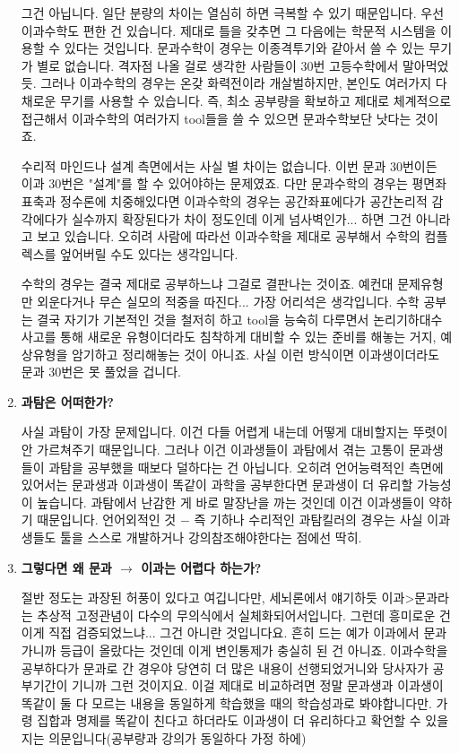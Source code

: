 \begin{enumerate}
그건 아닙니다. 일단 분량의 차이는 열심히 하면 극복할 수 있기 때문입니다.     우선 이과수학도 편한 건 있습니다. 제대로 틀을 갖추면 그 다음에는 학문적 시스템을 이용할 수 있다는 것입니다.   문과수학이 경우는 이종격투기와 같아서 쓸 수 있는 무기가 별로 없습니다. 격자점 나올 걸로 생각한 사람들이 30번 고등수학에서 말아먹었듯.   그러나 이과수학의 경우는 온갖 화력전이라 개살벌하지만, 본인도 여러가지 다채로운 무기를 사용할 수 있습니다.   즉, 최소 공부량을 확보하고 제대로 체계적으로 접근해서 이과수학의 여러가지 tool들을 쓸 수 있으면 문과수학보단 낫다는 것이죠.  
\vspace{5mm}

수리적 마인드나 설계 측면에서는 사실 별 차이는 없습니다. 이번 문과 30번이든 이과 30번은 "설계"를 할  수 있어야하는 문제였죠.   다만 문과수학의 경우는 평면좌표축과 정수론에 치중해있다면      이과수학의 경우는 공간좌표에다가 공간논리적 감각에다가 실수까지 확장된다가 차이 정도인데   이게 넘사벽인가... 하면 그건 아니라고 보고 있습니다.    오히려 사람에 따라선 이과수학을 제대로 공부해서 수학의 컴플렉스를 엎어버릴 수도 있다는 생각입니다.   
\vspace{5mm}

수학의 경우는 결국 제대로 공부하느냐 그걸로 결판나는 것이죠.   예컨대 문제유형만 외운다거나 무슨 실모의 적중을 따진다... 가장 어리석은 생각입니다.   수학 공부는 결국 자기가 기본적인 것을 철저히 하고 tool을 능숙히 다루면서 논리기하대수 사고를 통해   새로운 유형이더라도 침착하게 대비할 수 있는 준비를 해놓는 거지, 예상유형을 암기하고 정리해놓는 것이 아니죠.   사실 이런 방식이면 이과생이더라도 문과 30번은 못 풀었을 겁니다.   


\item \textbf{과탐은 어떠한가?}   

사실 과탐이 가장 문제입니다. 이건 다들 어렵게 내는데 어떻게 대비할지는 뚜렷이 안 가르쳐주기 때문입니다.   그러나 이건 이과생들이 과탐에서 겪는 고통이 문과생들이 과탐을 공부했을 때보다 덜하다는 건 아닙니다.   오히려 언어능력적인 측면에 있어서는 문과생과 이과생이 똑같이 과학을 공부한다면 문과생이 더 유리할 가능성이 높습니다.   과탐에서 난감한 게 바로 말장난을 까는 것인데 이건 이과생들이 약하기 때문입니다.   언어외적인 것 $-$ 즉 기하나 수리적인 과탐킬러의 경우는 사실 이과생들도 툴을 스스로 개발하거나 강의참조해야한다는 점에선 딱히.   


\item \textbf{그렇다면 왜 문과 $\rightarrow$ 이과는 어렵다 하는가?}   

절반 정도는 과장된 허풍이 있다고 여깁니다만, 세뇌론에서 얘기하듯 이과>문과라는 추상적 고정관념이 다수의 무의식에서 실체화되어서입니다.   그런데 흥미로운 건 이게 직접 검증되었느냐... 그건 아니란 것입니다요.   흔히 드는 예가 이과에서 문과 가니까 등급이 올랐다는 것인데 이게 변인통제가 충실히 된 건 아니죠.   이과수학을 공부하다가 문과로 간 경우야 당연히 더 많은 내용이 선행되었거니와 당사자가 공부기간이 기니까 그런 것이지요.   이걸 제대로 비교하려면 정말 문과생과 이과생이 똑같이 둘 다 모르는 내용을 동일하게 학습했을 때의 학습성과로 봐야합니다만.   가령 집합과 명제를 똑같이 친다고 하더라도 이과생이 더 유리하다고 확언할 수 있을지는 의문입니다(공부량과 강의가 동일하다 가정 하에)   
\vspace{5mm}


\end{enumerate}
